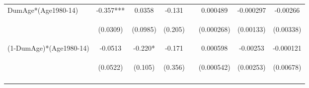 \begin{subtables}
\begin{landscape}
\begin{table}[htpb!]
\begin{center}
\begin{tabular}{lcccp{0.3cm}ccc}
DumAge*(Age1980-14)	&	-0.357***	&	0.0358	&	-0.131	&&	0.000489	&	-0.000297	&	-0.00266	 \\	
	& \begin{footnotesize}	(0.0309)	\end{footnotesize} & \begin{footnotesize}	(0.0985)	\end{footnotesize} & \begin{footnotesize}	(0.205)	\end{footnotesize} & \begin{footnotesize}\end{footnotesize} & \begin{footnotesize}	(0.000268)	\end{footnotesize} & \begin{footnotesize}	(0.00133)	\end{footnotesize} & \begin{footnotesize}	(0.00338)	\end{footnotesize} \\	
(1-DumAge)*(Age1980-14)	&	-0.0513	&	-0.220*	&	-0.171	&&	0.000598	&	-0.00253	&	-0.000121	 \\	
	& \begin{footnotesize}	(0.0522)	\end{footnotesize} & \begin{footnotesize}	(0.105)	\end{footnotesize} & \begin{footnotesize}	(0.356)	\end{footnotesize} & \begin{footnotesize}\end{footnotesize} & \begin{footnotesize}	(0.000542)	\end{footnotesize} & \begin{footnotesize}	(0.00253)	\end{footnotesize} & \begin{footnotesize}	(0.00678)	\end{footnotesize} \\	
\vspace{4pt}	&	\begin{footnotesize}\end{footnotesize}	&	\begin{footnotesize}\end{footnotesize}	&	\begin{footnotesize}\end{footnotesize}	& \begin{footnotesize}\end{footnotesize} &	\begin{footnotesize}\end{footnotesize}	&	\begin{footnotesize}\end{footnotesize}	&		\begin{footnotesize}\end{footnotesize}	 \\

\end{tabular}
\end{center}
\end{table}
\end{landscape}
\end{subtables}
